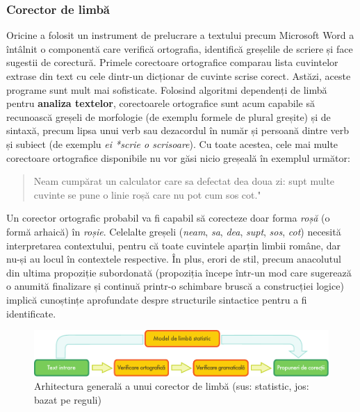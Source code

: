 \begin{multicols}{2}
\subsubsection{Corector de limbă}
Oricine a folosit un instrument de prelucrare a textului precum Microsoft Word a întâlnit o componentă care verifică ortografia, identifică greșelile de scriere și face sugestii de corectură. Primele corectoare ortografice comparau lista cuvintelor extrase din text cu cele dintr-un dicționar de cuvinte scrise corect. Astăzi, aceste programe sunt mult mai sofisticate. Folosind algoritmi dependenți de limbă pentru \textbf{analiza textelor}, corectoarele ortografice sunt acum capabile să recunoască greșeli de morfologie (de exemplu formele de plural greșite) și de sintaxă, precum lipsa unui verb sau dezacordul în număr și persoană dintre verb și subiect (de exemplu \textit{ei *scrie o scrisoare}). Cu toate acestea, cele mai multe corectoare ortografice disponibile nu vor găsi nicio greșeală în exemplul următor:
 
\begin{quote}
Neam cumpărat un calculator care sa defectat dea doua zi: supt multe cuvinte se pune o linie roșă care nu pot cum sos cot."\end{quote}

Un corector ortografic probabil va fi capabil să corecteze doar forma \textit{roșă} (o formă arhaică) în \textit{roșie}. Celelalte greșeli (\textit{neam}, \textit{sa}, \textit{dea}, \textit{supt}, \textit{sos}, \textit{cot}) necesită interpretarea contextului, pentru că toate cuvintele aparțin limbii române, dar nu-și au locul în contextele respective. În plus, erori de stil, precum anacolutul din ultima propoziție subordonată (propoziția începe într-un mod care sugerează o anumită finalizare și continuă printr-o schimbare bruscă a construcției logice) implică cunoștințe aprofundate despre structurile sintactice pentru a fi identificate.

\begin{figure}[htb]
\center
\includegraphics[width=\textwidth]{../_media/romanian/language_checking}
\caption{Arhitectura generală a unui corector de limbă (sus: statistic, jos: bazat pe reguli)}
\label{fig:langcheckingaarch_ro}
\vspace{-15mm}
\end{figure}


\end{multicols}
